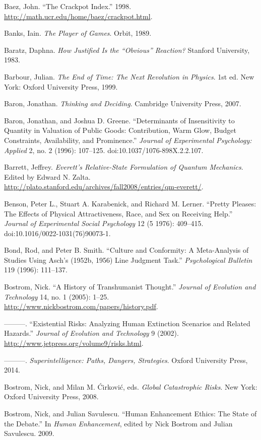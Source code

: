 \documentclass[letterpaper]{book}
\begin{document}
{
 Baez, John. ``The Crackpot
Index.'' 1998.
\url{http://math.ucr.edu/home/baez/crackpot.html}.}

{
 Banks, Iain. \textit{The Player of Games}. Orbit, 1989.}

{
 Baratz, Daphna. \textit{How Justified Is the
``Obvious'' Reaction?} Stanford
University, 1983.}

{
 Barbour, Julian. \textit{The End of Time: The Next Revolution in
Physics}. 1st ed. New York: Oxford University Press, 1999.}

{
 Baron, Jonathan. \textit{Thinking and Deciding}. Cambridge
University Press, 2007.}

{
 Baron, Jonathan, and Joshua D. Greene.
``Determinants of Insensitivity to Quantity in
Valuation of Public Goods: Contribution, Warm Glow, Budget Constraints,
Availability, and Prominence.'' \textit{Journal of
Experimental Psychology: Applied} 2, no. 2 (1996): 107--125.
doi:10.1037/1076-898X.2.2.107.}

{
 Barrett, Jeffrey. \textit{Everett's Relative-State
Formulation of Quantum Mechanics}. Edited by Edward N. Zalta.
\url{http://plato.stanford.edu/archives/fall2008/entries/qm-everett/}.}

{
 Benson, Peter L., Stuart A. Karabenick, and Richard M. Lerner.
``Pretty Pleases: The Effects of Physical
Attractiveness, Race, and Sex on Receiving Help.''
\textit{Journal of Experimental Social Psychology} 12 (5 1976):
409--415. doi:10.1016/0022-1031(76)90073-1.}

{
 Bond, Rod, and Peter B. Smith. ``Culture and
Conformity: A Meta-Analysis of Studies Using Asch's
(1952b, 1956) Line Judgment Task.''
\textit{Psychological Bulletin} 119 (1996): 111--137.}

{
 Bostrom, Nick. ``A History of Transhumanist
Thought.'' \textit{Journal of Evolution and
Technology} 14, no. 1 (2005): 1--25.
\url{http://www.nickbostrom.com/papers/history.pdf}.}

{
 {}---{}---{}---. ``Existential Risks: Analyzing
Human Extinction Scenarios and Related Hazards.''
\textit{Journal of Evolution and Technology} 9 (2002).
\url{http://www.jetpress.org/volume9/risks.html}.}

{
 {}---{}---{}---. \textit{Superintelligence: Paths, Dangers,
Strategies}. Oxford University Press, 2014.}

{
 Bostrom, Nick, and Milan M. \'Cirkovi\'c, eds. \textit{Global
Catastrophic Risks}. New York: Oxford University Press, 2008.}

{
 Bostrom, Nick, and Julian Savulescu. ``Human
Enhancement Ethics: The State of the Debate.'' In
\textit{Human Enhancement}, edited by Nick Bostrom and Julian
Savulescu. 2009.}
\end{document}
